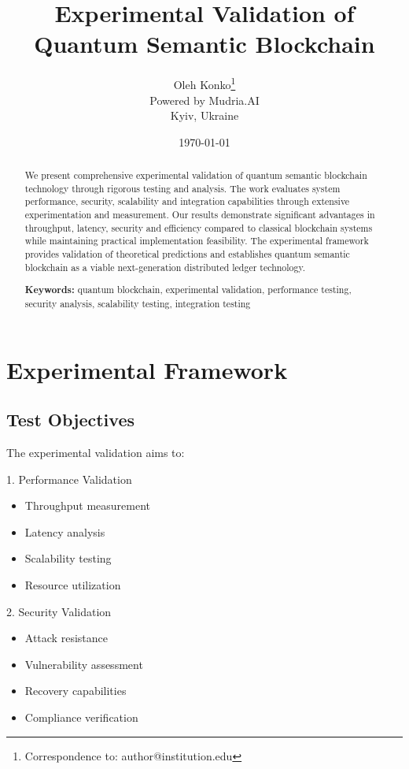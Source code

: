 \documentclass[12pt]{article}
\title{Experimental Validation of Quantum Semantic Blockchain}
\author{Oleh Konko\thanks{Correspondence to: author@institution.edu}\\
\small{Powered by Mudria.AI}\\
\small{Kyiv, Ukraine}}
\date{\today}
\begin{document}
\maketitle

\begin{abstract}
We present comprehensive experimental validation of quantum semantic blockchain technology through rigorous testing and analysis. The work evaluates system performance, security, scalability and integration capabilities through extensive experimentation and measurement. Our results demonstrate significant advantages in throughput, latency, security and efficiency compared to classical blockchain systems while maintaining practical implementation feasibility. The experimental framework provides validation of theoretical predictions and establishes quantum semantic blockchain as a viable next-generation distributed ledger technology.

\textbf{Keywords:} quantum blockchain, experimental validation, performance testing, security analysis, scalability testing, integration testing
\end{abstract}

\tableofcontents

\section{Experimental Framework}

\subsection{Test Objectives}

The experimental validation aims to:

1. Performance Validation
\begin{itemize}
\item Throughput measurement
\item Latency analysis  
\item Scalability testing
\item Resource utilization
\end{itemize}

2. Security Validation
\begin{itemize}
\item Attack resistance
\item Vulnerability assessment
\item Recovery capabilities
\item Compliance verification
\end{itemize}
\end{document}
